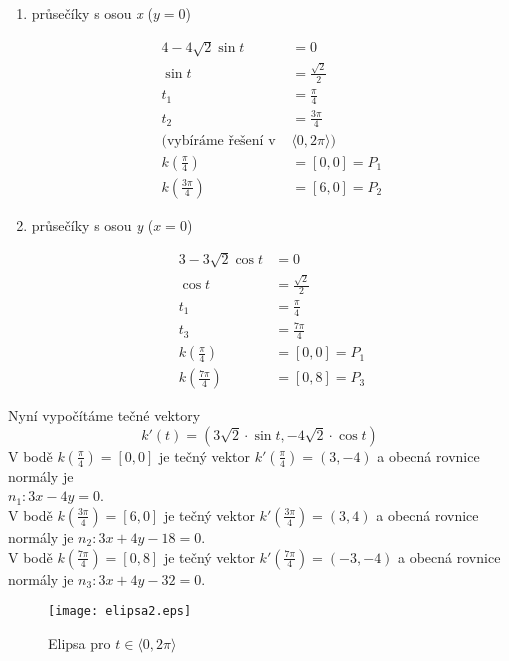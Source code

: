 		\begin{enumerate}
			\item průsečíky s osou \textit{x} ($y=0$)
			      				      		
			      \begin{align*}
			      	4-4\sqrt{2}\sin{t}              & = 0                           \\
			      	\sin{t}                         & = \frac{\sqrt{2}}{2}          \\
			      	t_1                             & = \frac{\pi}{4}               \\
			      	t_2                             & = \frac{3\pi}{4}              \\
			      	\text{(vybíráme řešení v } & \langle0, 2\pi\rangle\text{)} \\
			      	k\left(\frac{\pi}{4}\right)     & = [0, 0] = P_1                \\
			      	k\left(\frac{3\pi}{4}\right)    & = [6, 0] = P_2                
			      \end{align*}
			      				      			
			\item průsečíky s osou \textit{y} ($x=0$)
			      				      			
			      \begin{align*}
			      	3-3\sqrt{2}\cos{t}           & = 0                  \\
			      	\cos{t}                      & = \frac{\sqrt{2}}{2} \\
			      	t_1                          & = \frac{\pi}{4}      \\
			      	t_3                          & = \frac{7\pi}{4}     \\
			      	k\left(\frac{\pi}{4}\right)  & = [0, 0] = P_1       \\
			      	k\left(\frac{7\pi}{4}\right) & = [0, 8] = P_3       
			      \end{align*}
		\end{enumerate}
		Nyní vypočítáme tečné vektory
		$$k'(t) = (3\sqrt{2} \cdot \sin{t}, -4\sqrt{2} \cdot \cos{t})$$
		V bodě $k\left(\frac{\pi}{4}\right) = [0,0]$ je tečný vektor $k'\left(\frac{\pi}{4}\right) = (3,-4)$
		a obecná rovnice normály je \\ $n_1: 3x-4y=0$. \\
		V bodě $k\left(\frac{3\pi}{4}\right) = [6,0]$ je tečný vektor $k'\left(\frac{3\pi}{4}\right) = (3,4)$
		a obecná rovnice normály je $n_2: 3x+4y-18=0$. \\
		V bodě $k\left(\frac{7\pi}{4}\right) = [0,8]$ je tečný vektor $k'\left(\frac{7\pi}{4}\right) = (-3,-4)$
		a obecná rovnice normály je $n_3: 3x+4y-32=0$. \\
		\vfill
		\begin{figure}[H]
			\centering
			\texttt{[image: elipsa2.eps]}
			\caption{Elipsa pro $t \in \langle0, 2\pi\rangle$}
								
		\end{figure}
		\clearpage						
